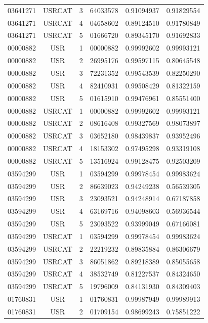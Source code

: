 \begin{longtable}{cccccc}
03641271 & USRCAT & 3 & 64033578 & 0.91094937 & 0.91829554\\
03641271 & USRCAT & 4 & 04658602 & 0.89124510 & 0.91780849\\
03641271 & USRCAT & 5 & 01666720 & 0.89345170 & 0.91692833\\
\hline
00000882 & USR    & 1 & 00000882 & 0.99992602 & 0.99993121\\%
00000882 & USR    & 2 & 26995176 & 0.99597115 & 0.80645548\\
00000882 & USR    & 3 & 72231352 & 0.99543539 & 0.82250290\\
00000882 & USR    & 4 & 82410931 & 0.99508429 & 0.81322159\\
00000882 & USR    & 5 & 01615910 & 0.99476961 & 0.85551400\\
00000882 & USRCAT & 1 & 00000882 & 0.99992602 & 0.99993121\\%
00000882 & USRCAT & 2 & 08616408 & 0.99327569 & 0.98073897\\
00000882 & USRCAT & 3 & 03652180 & 0.98439837 & 0.93952496\\
00000882 & USRCAT & 4 & 18153302 & 0.97495298 & 0.93319108\\
00000882 & USRCAT & 5 & 13516924 & 0.99128475 & 0.92503209\\
\hline
03594299 & USR    & 1 & 03594299 & 0.99978454 & 0.99983624\\%
03594299 & USR    & 2 & 86639023 & 0.94249238 & 0.56539305\\
03594299 & USR    & 3 & 23093521 & 0.94248914 & 0.67187858\\
03594299 & USR    & 4 & 63169716 & 0.94098603 & 0.56936544\\
03594299 & USR    & 5 & 23093522 & 0.93999049 & 0.67166081\\
03594299 & USRCAT & 1 & 03594299 & 0.99978454 & 0.99983624\\%
03594299 & USRCAT & 2 & 22219232 & 0.89835884 & 0.86306679\\
03594299 & USRCAT & 3 & 86051862 & 0.89218389 & 0.85055658\\
03594299 & USRCAT & 4 & 38532749 & 0.81227537 & 0.84324650\\
03594299 & USRCAT & 5 & 19796009 & 0.84131930 & 0.84309403\\
\hline
01760831 & USR    & 1 & 01760831 & 0.99987949 & 0.99989913\\%
01760831 & USR    & 2 & 01709154 & 0.98699243 & 0.75851222\\

\end{longtable}
